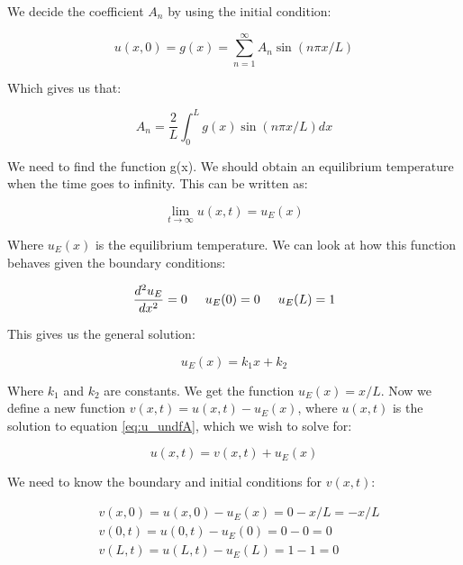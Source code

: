 \documentclass{article}
\begin{document}
We decide the coefficient $A_n$ by using the initial condition:

\begin{equation}
u(x,0)=g(x)=\sum_{n=1}^{\infty}A_n\sin{(n\pi x/L)}
\end{equation}

Which gives us that:

\begin{equation*}
A_n=\frac{2}{L}\int_0^Lg(x)\sin{(n\pi x/L)} dx
\end{equation*}

We need to find the function g(x). We should obtain an equilibrium temperature when the time goes to infinity. This can be written as:

\begin{equation*}
\lim_{t \to \infty} u(x,t) = u_E(x)
\end{equation*}

Where $u_E(x)$ is the equilibrium temperature. We can look at how this function behaves given the boundary conditions:

\begin{equation*}
\frac{d^2 u_E}{dx^2}=0 \hspace{0.5cm} u_E(0)=0\hspace{0.5cm} u_E(L)=1
\end{equation*}

This gives us the general solution:

\begin{equation*}
u_E(x)=k_1x + k_2
\end{equation*}

Where $k_1$ and $k_2$ are constants. We get the function $u_E(x)=x/L$. Now we define a new function $v(x,t)=u(x,t)-u_E(x)$, where $u(x,t)$ is the solution to equation \ref{eq:u_undfA}, which we wish to solve for:

\begin{equation}
u(x,t)=v(x,t)+u_E(x)
\label{eq:vu}
\end{equation}

We need to know the boundary and initial conditions for $v(x,t)$:

\begin{equation*}
\begin{split}
&v(x,0)=u(x,0)-u_E(x)=0-x/L=-x/L\\
&v(0,t)=u(0,t)-u_E(0)=0-0=0\\
&v(L,t)=u(L,t)-u_E(L)=1-1=0
\end{split}
\end{equation*}
 
\end{document}
